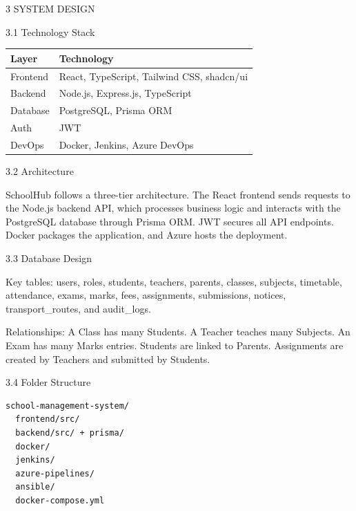 3  SYSTEM DESIGN

3.1  Technology Stack

\begin{tabular}{|p{2.5cm}|p{9.5cm}|}
\hline
\textbf{Layer} & \textbf{Technology} \\ \hline
Frontend & React, TypeScript, Tailwind CSS, shadcn/ui \\ \hline
Backend & Node.js, Express.js, TypeScript \\ \hline
Database & PostgreSQL, Prisma ORM \\ \hline
Auth & JWT \\ \hline
DevOps & Docker, Jenkins, Azure DevOps \\ \hline
\end{tabular}

3.2  Architecture

SchoolHub follows a three-tier architecture. The React frontend sends requests to the Node.js backend API, which processes business logic and interacts with the PostgreSQL database through Prisma ORM. JWT secures all API endpoints. Docker packages the application, and Azure hosts the deployment.

3.3  Database Design

Key tables: users, roles, students, teachers, parents, classes, subjects, timetable, attendance, exams, marks, fees, assignments, submissions, notices, transport\_routes, and audit\_logs.

Relationships: A Class has many Students. A Teacher teaches many Subjects. An Exam has many Marks entries. Students are linked to Parents. Assignments are created by Teachers and submitted by Students.

3.4  Folder Structure

\begin{verbatim}
school-management-system/
  frontend/src/
  backend/src/ + prisma/
  docker/
  jenkins/
  azure-pipelines/
  ansible/
  docker-compose.yml
\end{verbatim}
